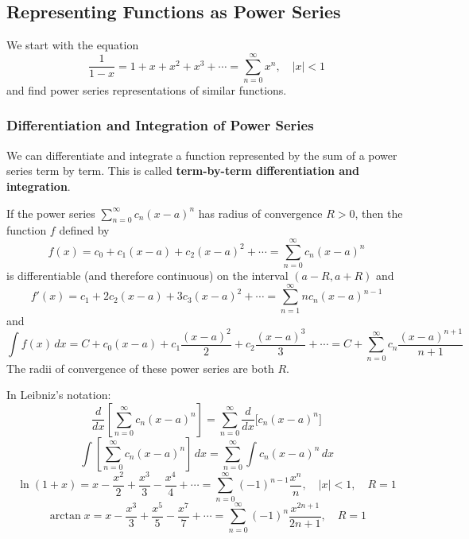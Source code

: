 \subsection{Representing Functions as Power Series}

We start with the equation
\[\frac{1}{1-x}=1+x+x^2+x^3+\cdots=\sum_{n=0}^\infty x^n,\quad|x|<1\]
and find power series representations of similar functions.

\subsubsection*{Differentiation and Integration of Power Series}

We can differentiate and integrate a function represented by the sum of a
power series term by term.
This is called \textbf{term-by-term differentiation and integration}.
\begin{theorem}
    If the power series \(\displaystyle{\sum_{n=0}^\infty c_n(x-a)^n}\) has radius of convergence \(R>0\),
    then the function \(f\) defined by
    \[f(x)=c_0+c_1(x-a)+c_2(x-a)^2+\cdots=\sum_{n=0}^\infty c_n(x-a)^n\]
    is differentiable (and therefore continuous) on the interval
    \((a-R,a+R)\) and
    \[f'(x)=c_1+2c_2(x-a)+3c_3(x-a)^2+\cdots
    =\sum_{n=1}^\infty nc_n(x-a)^{n-1}\]
    and
    \[\int f(x)\,dx
    =C+c_0(x-a)+c_1\frac{(x-a)^2}{2}+c_2\frac{(x-a)^3}{3}+\cdots
    =C+\sum_{n=0}^\infty c_n\frac{(x-a)^{n+1}}{n+1}\]
    The radii of convergence of these power series are both \(R\).
\end{theorem}
In Leibniz's notation:
\[\frac{d}{dx}\left[\sum_{n=0}^\infty c_n(x-a)^n\right]
=\sum_{n=0}^\infty\frac{d}{dx}\big[c_n(x-a)^n\big]\]
\[\int\left[\sum_{n=0}^\infty c_n(x-a)^n\right]\,dx
=\sum_{n=0}^\infty\int c_n(x-a)^n\,dx\]
\[\ln(1+x)=x-\frac{x^2}{2}+\frac{x^3}{3}-\frac{x^4}{4}+\cdots
=\sum_{n=0}^\infty(-1)^{n-1}\frac{x^n}{n},\quad|x|<1,\quad R=1\]
\[\arctan x=x-\frac{x^3}{3}+\frac{x^5}{5}-\frac{x^7}{7}+\cdots
=\sum_{n=0}^\infty(-1)^n\frac{x^{2n+1}}{2n+1},\quad R=1\]